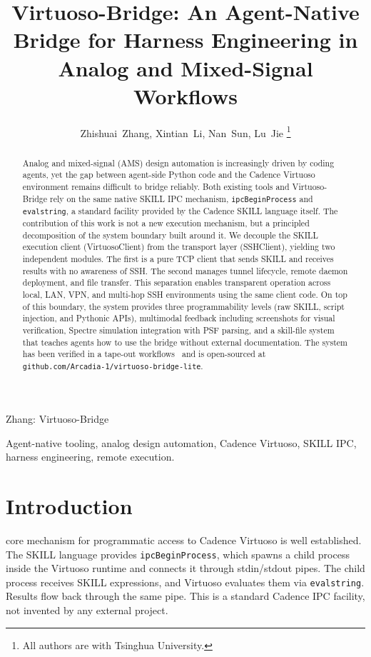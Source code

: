 \documentclass[lettersize,journal]{ieee_template/IEEEtran}
\begin{document}
\title{Virtuoso-Bridge: An Agent-Native Bridge for Harness Engineering in Analog and Mixed-Signal Workflows}

\author{Zhishuai~Zhang, Xintian~Li, Nan~Sun, Lu~Jie%
\thanks{All authors are with Tsinghua University.}%
}

\markboth{}%
{Zhang: Virtuoso-Bridge}

\maketitle

\begin{abstract}
Analog and mixed-signal (AMS) design automation is increasingly driven by coding agents, yet the gap between agent-side Python code and the Cadence Virtuoso environment remains difficult to bridge reliably. Both existing tools and Virtuoso-Bridge rely on the same native SKILL IPC mechanism, \texttt{ipcBeginProcess} and \texttt{evalstring}, a standard facility provided by the Cadence SKILL language itself. The contribution of this work is not a new execution mechanism, but a principled decomposition of the system boundary built around it. We decouple the SKILL execution client (VirtuosoClient) from the transport layer (SSHClient), yielding two independent modules. The first is a pure TCP client that sends SKILL and receives results with no awareness of SSH. The second manages tunnel lifecycle, remote daemon deployment, and file transfer. This separation enables transparent operation across local, LAN, VPN, and multi-hop SSH environments using the same client code. On top of this boundary, the system provides three programmability levels (raw SKILL, script injection, and Pythonic APIs), multimodal feedback including screenshots for visual verification, Spectre simulation integration with PSF parsing, and a skill-file system that teaches agents how to use the bridge without external documentation. The system has been verified in a tape-out workflows~\cite{amsioagent} and is open-sourced at \texttt{github.com/Arcadia-1/virtuoso-bridge-lite}.
\end{abstract}

\begin{IEEEkeywords}
Agent-native tooling, analog design automation, Cadence Virtuoso, SKILL IPC, harness engineering, remote execution.
\end{IEEEkeywords}

\section{Introduction}
 core mechanism for programmatic access to Cadence Virtuoso is well established. The SKILL language provides \texttt{ipcBeginProcess}, which spawns a child process inside the Virtuoso runtime and connects it through stdin/stdout pipes. The child process receives SKILL expressions, and Virtuoso evaluates them via \texttt{evalstring}. Results flow back through the same pipe. This is a standard Cadence IPC facility, not invented by any external project.
\end{document}
